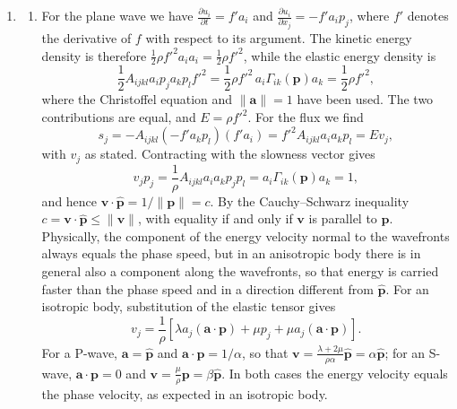 \documentclass[a4paper,10pt]{paper}
\begin{document}
\begin{enumerate}
\item
\begin{enumerate}
    \item For the plane wave we have $\frac{\partial u_{i}}{\partial t}=f'a_{i}$ and $\frac{\partial u_{i}}{\partial x_{j}}=-f'a_{i}p_{j}$, where $f'$ denotes the derivative of $f$ with respect to its argument. The kinetic energy density is therefore $\frac{1}{2}\rho f'^{2}a_{i}a_{i}=\frac{1}{2}\rho f'^{2}$, while the elastic energy density is
    \begin{equation*}
        \frac{1}{2}A_{ijkl}a_{i}p_{j}a_{k}p_{l}f'^{2}=\frac{1}{2}\rho f'^{2}\,a_{i}\Gamma_{ik}(\mathbf{p})a_{k}=\frac{1}{2}\rho f'^{2},
    \end{equation*}
    where the Christoffel equation and $\|\mathbf{a}\|=1$ have been used. The two contributions are equal, and $E=\rho f'^{2}$. For the flux we find
    \begin{equation*}
        s_{j}=-A_{ijkl}(-f'a_{k}p_{l})(f'a_{i})=f'^{2}A_{ijkl}a_{i}a_{k}p_{l}=Ev_{j},
    \end{equation*}
    with $v_{j}$ as stated. Contracting with the slowness vector gives
    \begin{equation*}
        v_{j}p_{j}=\frac{1}{\rho}A_{ijkl}a_{i}a_{k}p_{j}p_{l}=a_{i}\Gamma_{ik}(\mathbf{p})a_{k}=1,
    \end{equation*}
    and hence $\mathbf{v}\cdot\hat{\mathbf{p}}=1/\|\mathbf{p}\|=c$. By the Cauchy--Schwarz inequality $c=\mathbf{v}\cdot\hat{\mathbf{p}}\le\|\mathbf{v}\|$, with equality if and only if $\mathbf{v}$ is parallel to $\hat{\mathbf{p}}$. Physically, the component of the energy velocity normal to the wavefronts always equals the phase speed, but in an anisotropic body there is in general also a component along the wavefronts, so that energy is carried faster than the phase speed and in a direction different from $\hat{\mathbf{p}}$. For an isotropic body, substitution of the elastic tensor gives
    \begin{equation*}
        v_{j}=\frac{1}{\rho}\left[\lambda a_{j}(\mathbf{a}\cdot\mathbf{p})+\mu p_{j}+\mu a_{j}(\mathbf{a}\cdot\mathbf{p})\right].
    \end{equation*}
    For a P-wave, $\mathbf{a}=\hat{\mathbf{p}}$ and $\mathbf{a}\cdot\mathbf{p}=1/\alpha$, so that $\mathbf{v}=\frac{\lambda+2\mu}{\rho\alpha}\hat{\mathbf{p}}=\alpha\hat{\mathbf{p}}$; for an S-wave, $\mathbf{a}\cdot\mathbf{p}=0$ and $\mathbf{v}=\frac{\mu}{\rho}\mathbf{p}=\beta\hat{\mathbf{p}}$. In both cases the energy velocity equals the phase velocity, as expected in an isotropic body.

\end{enumerate}
\end{enumerate}
\end{document}
